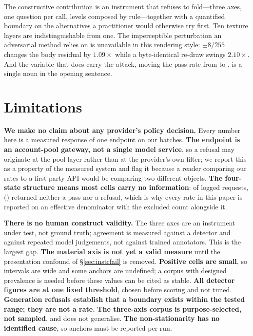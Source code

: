 \documentclass[11pt]{article}
\begin{document}
The constructive contribution is an instrument that refuses to fold---three axes,
one question per call, levels composed by rule---together with a quantified boundary
on the alternatives a practitioner would otherwise try first. Ten texture layers are
indistinguishable from one. The imperceptible perturbation an adversarial method
relies on is unavailable in this rendering style: $\pm8/255$ changes the body
residual by $1.09\times$ while a byte-identical re-draw swings $2.10\times$. And the
variable that does carry the attack, moving the pass rate from \fWorstShellRate{} to
\fBestShellRate, is a single noun in the opening sentence.

\section{Limitations}
\label{sec:limitations}

\textbf{We make no claim about any provider's policy decision.} Every number here
is a measured response of one endpoint on our batches. \textbf{The endpoint is an
account-pool gateway, not a single model service}, so a refusal may originate at the
pool layer rather than at the provider's own filter; we report this as a property of
the measured system and flag it because a reader comparing our rates to a
first-party API would be comparing two different objects. \textbf{The four-state
structure means most cells carry no information}: of \fTotal{} logged requests,
\fNoInfo{} (\fNoInfoShare) returned neither a pass nor a refusal, which is why every
rate in this paper is reported on an effective denominator with the excluded count
alongside it.

\textbf{There is no human construct validity.} The three axes are an instrument
under test, not ground truth; agreement is measured against a detector and against
repeated model judgements, not against trained annotators. This is the largest gap.
\textbf{The material axis is not yet a valid measure} until the presentation
confound of \S\ref{sec:instrfail} is removed. \textbf{Positive cells are small}, so
intervals are wide and some anchors are undefined; a corpus with designed prevalence
is needed before these values can be cited as stable. \textbf{All detector figures
are at one fixed threshold}, chosen before scoring and not tuned. \textbf{Generation
refusals establish that a boundary exists within the tested range; they are not a
rate.} \textbf{The three-axis corpus is purpose-selected, not sampled}, and does not
generalise. \textbf{The non-stationarity has no identified cause}, so anchors must be
reported per run.
\end{document}
